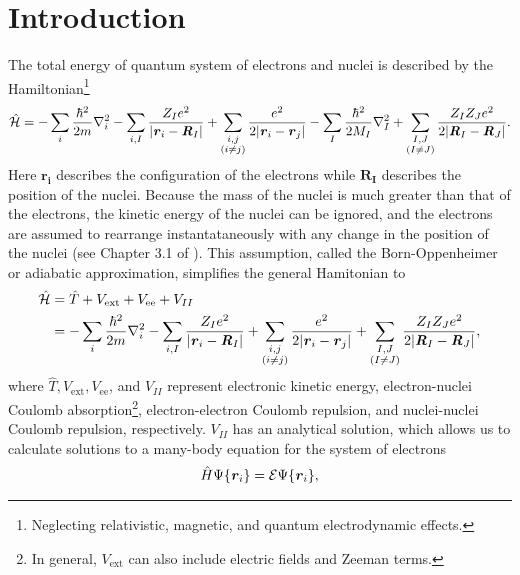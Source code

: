 \section{Introduction}
The total energy of quantum system of electrons and nuclei is described by the
Hamiltonian\footnote{Neglecting relativistic, magnetic, and quantum
electrodynamic effects.}
%
 \begin{equation}\label{generalhen}
\mathcal{\hat H}=-\sum_i\frac{\hbar^2}{2m}\nabla_i^2-
\sum_{i,I}\frac{Z_Ie^2}{|\textbf{\textit r}_i-\textbf{\textit R}_I|}+
\sum_{\substack{i,j\\(i\neq j)}}\frac{e^2}{2|\textbf{\textit r}_i-\textbf{\textit r}_j|}-
\sum_I\frac{\hbar^2}{2M_I}\nabla_I^2+
\sum_{\substack{I,J\\(I\neq J)}}\frac{Z_IZ_Je^2}{2|\textbf{\textit R}_I-\textbf{\textit R}_J|}.
\end{equation}
%
Here $\mathbf{r_i}$ describes the configuration of the electrons while $\mathbf{R_I}$ describes the position
of the nuclei.  Because the mass of the nuclei is much greater than that of the
electrons, the kinetic energy of the nuclei can be ignored, and the electrons are
assumed to rearrange instantataneously with any change in the position of the nuclei
(see Chapter 3.1 of \cite{martin-esbook}). This assumption, called the
Born-Oppenheimer or adiabatic approximation, simplifies the general Hamitonian to
%
\begin{equation}\label{generalhee}
\begin{aligned}
\mathcal{\hat H}&=\hat{T}+V_\text{ext}+V_\text{ee}+V_{II} \\
&=-\sum_i\frac{\hbar^2}{2m}\nabla_i^2-
\sum_{i,I}\frac{Z_Ie^2}{|\textbf{\textit r}_i-\textbf{\textit R}_I|}+
\sum_{\substack{i,j\\(i\neq j)}}\frac{e^2}{2|\textbf{\textit r}_i-\textbf{\textit r}_j|}+
\sum_{\substack{I,J\\(I\neq J)}}\frac{Z_IZ_Je^2}{2|\textbf{\textit R}_I-\textbf{\textit R}_J|},
\end{aligned}
\end{equation}
%
where $\hat{T}, V_\text{ext}, V_\text{ee}$, and $V_{II}$ represent electronic kinetic
energy, electron-nuclei Coulomb absorption\footnote{In general, $V_\text{ext}$ can
also include electric fields and Zeeman terms.}, electron-electron Coulomb repulsion,
and nuclei-nuclei Coulomb repulsion, respectively. $V_{II}$ has an analytical
solution, which allows us to calculate solutions to a many-body equation for the system of electrons 
%
\begin{equation}\label{generaleeq}
\begin{aligned}
\hat{H}\Psi\{\textbf{\textit r}_i\}=\mathcal{E}\Psi\{\textbf{\textit r}_i\}, 
\end{aligned}
\end{equation}
